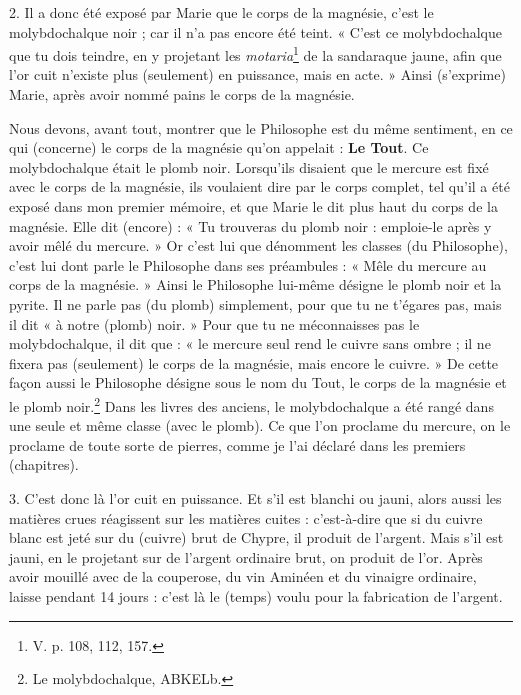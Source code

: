 \documentclass[landscape, a4paper, 11pt, oneside, polutonikogreek, french]{article}
\begin{document}
2. Il a donc été exposé par Marie que le corps de la magnésie, c'est le molybdochalque noir ; car il n'a pas encore été teint. « C'est ce molybdochalque que tu dois teindre, en y projetant les \emph{motaria}\footnote{V. p. 108, 112, 157.} de la sandaraque jaune, afin que l'or cuit n'existe plus (seulement) en puissance, mais en acte. » Ainsi (s'exprime) Marie, après avoir nommé pains le corps de la magnésie.

Nous devons, avant tout, montrer que le Philosophe est du même sentiment, en ce qui (concerne) le corps de la magnésie qu'on appelait : \textbf{Le Tout}. Ce molybdochalque était le plomb noir. Lorsqu'ils disaient que le mercure est fixé avec le corps de la magnésie, ils voulaient dire par le corps complet, tel qu'il a été exposé dans mon premier mémoire, et que Marie le dit plus haut du corps de la magnésie. Elle dit (encore) : « Tu trouveras du plomb noir : emploie-le après y avoir mêlé du mercure. » Or c'est lui que dénomment les classes (du Philosophe), c'est lui dont parle le Philosophe dans ses préambules : « Mêle du mercure au corps de la magnésie. » Ainsi le Philosophe lui-même désigne le plomb noir et la pyrite. Il ne parle pas (du plomb) simplement, pour que tu ne t'égares pas, mais il dit « à notre (plomb) noir. » Pour que tu ne méconnaisses pas le molybdochalque, il dit que : « le mercure seul rend le cuivre sans ombre ; il ne fixera pas (seulement) le corps de la magnésie, mais encore le cuivre. » De cette façon aussi le Philosophe désigne sous le nom du Tout, le corps de la magnésie et le plomb noir.\footnote{Le molybdochalque, ABKELb.} Dans les livres des anciens, le molybdochalque a été rangé dans une seule et même classe (avec le plomb). Ce que l'on proclame du mercure, on le proclame de toute sorte de pierres, comme je l'ai déclaré dans les premiers (chapitres).

3. C'est donc là l'or cuit en puissance. Et s'il est blanchi ou jauni, alors aussi les matières crues réagissent sur les matières cuites : c'est-à-dire que si du cuivre blanc est jeté sur du (cuivre) brut de Chypre, il produit de l'argent. Mais s'il est jauni, en le projetant sur de l'argent ordinaire brut, on produit de l'or. Après avoir mouillé avec de la couperose, du vin Aminéen et du vinaigre ordinaire, laisse pendant 14 jours : c'est là le (temps) voulu pour la fabrication de l'argent.
\end{document}
